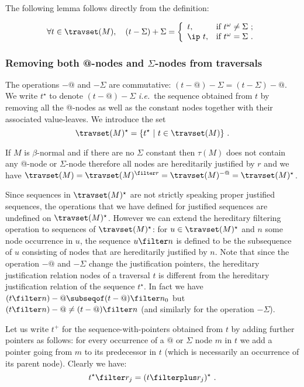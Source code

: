The following lemma follows directly from the definition:
\begin{lemma} \label{lem:minus_sig_plus_sig}
$$\forall t \in \travset(M), \quad (t-\Sigma)+\Sigma = \left\{
            \begin{array}{ll}
              t, & \hbox{if $t^\omega \neq \Sigma$\ ;} \\
              \ip\ t, & \hbox{if $t^\omega = \Sigma$\ .}
            \end{array}
          \right.
$$
\end{lemma}

\subsubsection{Removing both @-nodes and $\Sigma$-nodes from traversals}
\label{sec:tstar}
The operations $-@$ and $-\Sigma$ are commutative:
$(t-@)-\Sigma = (t-\Sigma)-@$. We write $t^\star$ to denote
$(t-@)-\Sigma$ {\it i.e.}\ the sequence obtained from $t$ by
removing all the @-nodes as well as the constant nodes together with
their associated value-leaves. We introduce the set
$$\travset(M)^\star = \{ t^\star \ | \  t \in \travset(M) \} \ .$$

\begin{remark}
If $M$ is $\beta$-normal and if there are no $\Sigma$ constant then $\tau(M)$ does not contain any @-node
or $\Sigma$-node therefore all nodes are hereditarily justified by $r$ and we have
$ \travset(M) = \travset(M)^{\filter r} = \travset(M)^{-@} = \travset(M)^\star$.
\end{remark}


Since sequences in $\travset(M)^\star$ are not strictly speaking
proper justified sequences, the operations that we have defined for
justified sequences are undefined on $\travset(M)^\star$. However we
can extend the hereditary filtering operation to sequences of
$\travset(M)^\star$: for $u\in \travset(M)^\star$ and $n$ some node
occurrence in $u$, the sequence $u\filter n$ is defined to be the
subsequence of $u$ consisting of nodes that are hereditarily
justified by $n$. Note that since the operation $-@$ and $-\Sigma$ change the
justification pointers, the hereditary justification relation nodes
of a traversal $t$ is different from the hereditary justification
relation of the sequence $t^\star$. In fact we have $(t\filter n)-@ \subseqof (t-@)
\filter n_0$ but $(t\filter n)-@ \neq (t-@) \filter n$ (and similarly for the operation $-\Sigma$).

Let us write $t^+$ for the sequence-with-pointers obtained from $t$
by adding further pointers as follows: for every occurrence of a $@$
or $\Sigma$ node $m$ in $t$ we add a pointer going from $m$ to its
predecessor in $t$ (which is necessarily an occurrence of its parent
node). Clearly we have:
\begin{equation}
t^\star \filter r_j = (t\filterplus r_j)^\star \label{eqn:starfilter_filterplusstar} \ .
\end{equation}

